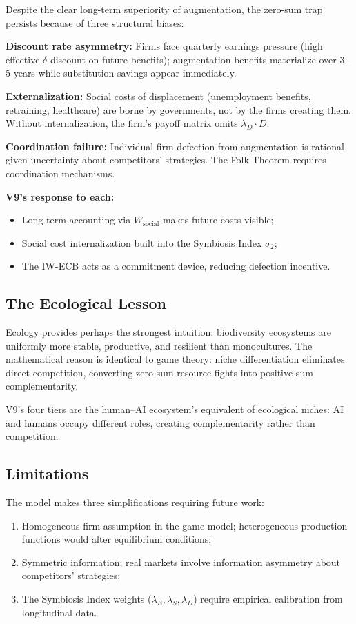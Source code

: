 \documentclass[conference]{IEEEtran}
\begin{document}
Despite the clear long-term superiority of augmentation,
the zero-sum trap persists because of three structural
biases:

\textbf{Discount rate asymmetry:}
Firms face quarterly earnings pressure (high effective
$\delta$ discount on future benefits); augmentation
benefits materialize over 3--5 years while substitution
savings appear immediately.

\textbf{Externalization:}
Social costs of displacement (unemployment benefits,
retraining, healthcare) are borne by governments,
not by the firms creating them. Without internalization,
the firm's payoff matrix omits $\lambda_D \cdot D$.

\textbf{Coordination failure:}
Individual firm defection from augmentation is
rational given uncertainty about competitors' strategies.
The Folk Theorem requires coordination mechanisms.

\textbf{V9's response to each:}
\begin{itemize}
  \item Long-term accounting via $W_{\text{social}}$
        makes future costs visible;
  \item Social cost internalization built into the
        Symbiosis Index $\sigma_2$;
  \item The IW-ECB acts as a commitment device,
        reducing defection incentive.
\end{itemize}

\subsection{The Ecological Lesson}

Ecology provides perhaps the strongest intuition:
biodiversity ecosystems are uniformly more stable,
productive, and resilient than monocultures.
The mathematical reason is identical to game theory:
niche differentiation eliminates direct competition,
converting zero-sum resource fights into positive-sum
complementarity.

V9's four tiers are the human--AI ecosystem's
equivalent of ecological niches: AI and humans
occupy different roles, creating complementarity
rather than competition.

\subsection{Limitations}

The model makes three simplifications requiring
future work:
\begin{enumerate}
  \item Homogeneous firm assumption in the game model;
        heterogeneous production functions would
        alter equilibrium conditions;
  \item Symmetric information; real markets involve
        information asymmetry about competitors' strategies;
  \item The Symbiosis Index weights ($\lambda_E, \lambda_S,
        \lambda_D$) require empirical calibration
        from longitudinal data.
\end{enumerate}
\end{document}
